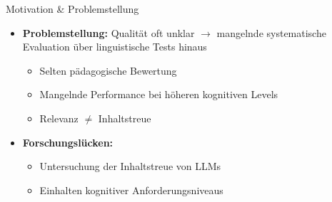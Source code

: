 \documentclass[usenames, dvipsnames, aspectratio=32]{beamer}
\begin{document}
\begin{frame}[allowframebreaks]{Motivation \& Problemstellung}
\begin{itemize}
        \item \textbf{Problemstellung:} Qualität oft unklar $\to$ mangelnde systematische Evaluation über linguistische Tests hinaus \cite{horbach_linguistic_2020} 
        \begin{itemize}
            \item Selten pädagogische Bewertung \cite{zhuge_twinstar_2025,blobstein_angel_2023,scaria_how_2024}
            \item Mangelnde Performance bei höheren kognitiven Levels \cite{elkins_how_2023,scaria_how_2024}
            \item Relevanz $\neq$ Inhaltstreue \cite{elkins_how_2023,hang_mcqgen_2024,mi_comparative_2024}
        \end{itemize}
        \vspace{.5em}
        \item \textbf{Forschungslücken:}
        \begin{itemize}
            \item Untersuchung der Inhaltstreue von LLMs
            \item Einhalten kognitiver Anforderungsniveaus
        \end{itemize}
    \end{itemize}
\end{frame}
\end{document}
